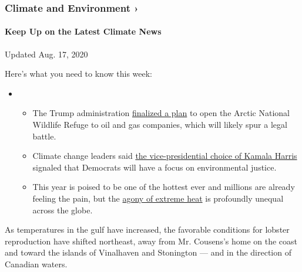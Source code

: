 \href{https://www.nytimes.com/section/climate?action=click\&pgtype=Article\&state=default\&region=MAIN_CONTENT_1\&context=storylines_keepup}{}

\hypertarget{climate-and-environment-}{%
\subsubsection{Climate and Environment
›}\label{climate-and-environment-}}

\hypertarget{keep-up-on-the-latest-climate-news}{%
\paragraph{Keep Up on the Latest Climate
News}\label{keep-up-on-the-latest-climate-news}}

Updated Aug. 17, 2020

Here's what you need to know this week:

\begin{itemize}
\item
  \begin{itemize}
  \tightlist
  \item
    The Trump administration
    \href{https://www.nytimes.com/2020/08/17/climate/alaska-oil-drilling-anwr.html?action=click\&pgtype=Article\&state=default\&region=MAIN_CONTENT_1\&context=storylines_keepup}{finalized
    a plan} to open the Arctic National Wildlife Refuge to oil and gas
    companies, which will likely spur a legal battle.
  \item
    Climate change leaders said
    \href{https://www.nytimes.com/2020/08/12/climate/kamala-harris-environmental-justice.html?action=click\&pgtype=Article\&state=default\&region=MAIN_CONTENT_1\&context=storylines_keepup}{the
    vice-presidential choice of Kamala Harris} signaled that Democrats
    will have a focus on environmental justice.
  \item
    This year is poised to be one of the hottest ever and millions are
    already feeling the pain, but the
    \href{https://www.nytimes.com/interactive/2020/08/06/climate/climate-change-inequality-heat.html?action=click\&pgtype=Article\&state=default\&region=MAIN_CONTENT_1\&context=storylines_keepup}{agony
    of extreme heat} is profoundly unequal across the globe.
  \end{itemize}
\end{itemize}

As temperatures in the gulf have increased, the favorable conditions for
lobster reproduction have shifted northeast, away from Mr. Cousens's
home on the coast and toward the islands of Vinalhaven and Stonington
--- and in the direction of Canadian waters.

